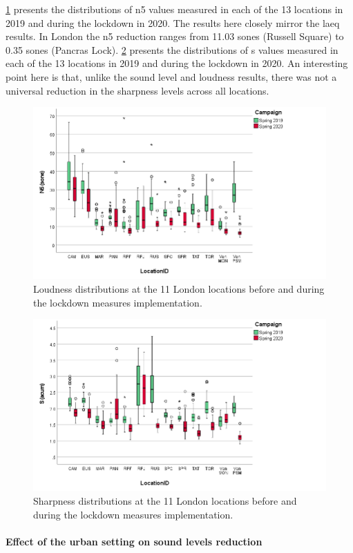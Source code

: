 \cref{fig:NsMapLockN5} presents the distributions of \gls{n5} values measured in each of the 13 locations in 2019 and during the lockdown in 2020. The results here closely mirror the \gls{laeq} results. In London the \gls{n5} reduction ranges from 11.03 sones (Russell Square) to 0.35 sones (Pancras Lock). \cref{fig:NsMapLockS} presents the distributions of \gls{s} values measured in each of the 13 locations in 2019 and during the lockdown in 2020. An interesting point here is that, unlike the sound level and loudness results, there was not a universal reduction in the sharpness levels across all locations.

\begin{figure}[h]
  \centering
  \includegraphics[width=.75\textwidth]{Figures/LockdownLoudness.png}
  \caption{Loudness distributions at the 11 London locations before and during the lockdown measures implementation. \label{fig:NsMapLockN5}}
\end{figure}


\begin{figure}[h]
  \centering
  \includegraphics[width=.75\textwidth]{Figures/LockdownSharp.png}
  \caption{Sharpness distributions at the 11 London locations before and during the lockdown measures implementation. \label{fig:NsMapLockS}}
\end{figure}

\paragraph*{Effect of the urban setting on sound levels reduction}


